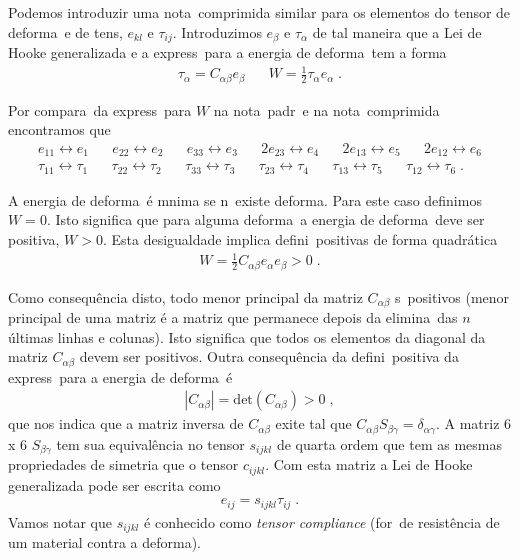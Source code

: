Podemos introduzir uma nota\cao\ comprimida similar para
os elementos do tensor de deforma\cao\ e de tens\ao, 
$e_{kl}$ e $\tau_{ij}$. Introduzimos $e_{\beta}$ e
$\tau_{\alpha}$ de tal maneira que a Lei de Hooke
generalizada e a express\ao\ para a energia de deforma\cao\
tem a forma
\begin{eqnarray}
\tau_{\alpha} = C_{\alpha \beta} e_{\beta} \;\;\;\;\;\;
W = \frac{1}{2}\tau_{\alpha}e_{\alpha} \; .
\end{eqnarray}

Por compara\cao\ da express\ao\ para $W$ na nota\cao\
padr\ao\ e na nota\cao\ comprimida encontramos que
\begin{eqnarray*}
e_{11} \leftrightarrow e_{1} \;\;\;\;\;\;
e_{22} \leftrightarrow e_{2} \;\;\;\;\;\;
e_{33} \leftrightarrow e_{3} \;\;\;\;\;\;
2e_{23} \leftrightarrow e_{4} \;\;\;\;\;\;
2e_{13} \leftrightarrow e_{5} \;\;\;\;\;\;
2e_{12} \leftrightarrow e_{6} \\
\tau_{11} \leftrightarrow \tau_{1} \;\;\;\;\;\;
\tau_{22} \leftrightarrow \tau_{2} \;\;\;\;\;\;
\tau_{33} \leftrightarrow \tau_{3} \;\;\;\;\;\;
\tau_{23} \leftrightarrow \tau_{4} \;\;\;\;\;\;
\tau_{13} \leftrightarrow \tau_{5} \;\;\;\;\;\;
\tau_{12} \leftrightarrow \tau_{6} \; .
\end{eqnarray*}

A energia de deforma\cao\ \'e m\ih nima se n\ao\ existe
deforma\cao. Para este caso definimos $W=0$. Isto
significa que para alguma deforma\cao\ a energia de
deforma\cao\ deve ser positiva, $W>0$. Esta desigualdade
implica defini\coes\ positivas de
forma quadr\'atica
\begin{eqnarray}
W = \frac{1}{2}C_{\alpha \beta}e_{\alpha}e_{\beta}>0 \; .
\end{eqnarray}

Como consequ\^encia disto, todo menor principal da matriz $C_{\alpha
\beta}$ s\ao\ positivos (menor principal de uma matriz \'e a matriz que
permanece depois da elimina\cao\ das $n$ \'ultimas linhas e colunas).
Isto significa que todos os elementos da diagonal da matriz $C_{\alpha
\beta}$ devem ser positivos. Outra consequ\^encia da defini\cao\
positiva da express\ao\ para a energia de deforma\cao\ \'e
\begin{eqnarray}
|C_{\alpha \beta}| = \mbox{det}(C_{\alpha \beta}) > 0 \; ,
\end{eqnarray}
que nos indica que a matriz inversa de $C_{\alpha \beta}$ exite tal que
$C_{\alpha \beta} S_{\beta \gamma} = \delta_{\alpha \gamma}$. A matriz 6
x 6 $S_{\beta \gamma}$ tem sua equival\^encia no tensor $s_{ijkl}$ de
quarta ordem que tem as mesmas propriedades de simetria que o tensor
$c_{ijkl}$. Com esta matriz a Lei de Hooke generalizada pode ser escrita
como
\begin{eqnarray}
e_{ij} = s_{ijkl} \tau_{ij} \; .
\end{eqnarray}
Vamos notar que $s_{ijkl}$ \'e conhecido como {\it tensor compliance}
(for\ca\ de resist\^encia de um material contra a deforma\cao).

